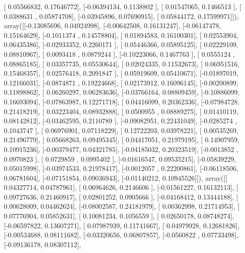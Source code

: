 \documentclass{article}
\begin{document}
       [ 0.05566832,  0.17646772],
       [-0.06394134,  0.1138802 ],
       [ 0.01547065,  0.1466513 ],
       [ 0.0388631 ,  0.05874708],
       [-0.03945896,  0.07690915],
       [ 0.05844172,  0.17599971]]), array([[-0.13085696,  0.04924998],
       [-0.00642508,  0.16131247],
       [-0.06147478,  0.15164629],
       [-0.1011374 ,  0.14578804],
       [ 0.01894583,  0.16100301],
       [ 0.02553904,  0.06435386],
       [-0.02933352,  0.2260171 ],
       [ 0.05446366,  0.05895125],
       [ 0.02229109,  0.08810967],
       [ 0.0093418 ,  0.0879244 ],
       [-0.10223066,  0.1467763 ],
       [ 0.0555124 ,  0.08865185],
       [ 0.03357735,  0.05530644],
       [ 0.02024335,  0.11532673],
       [ 0.06951516,  0.15468357],
       [ 0.02576418,  0.2091847 ],
       [ 0.05919609,  0.05410671],
       [-0.01897019,  0.12166031],
       [-0.0874871 ,  0.19224668],
       [ 0.02173912,  0.16096145],
       [-0.00200899,  0.11898862],
       [ 0.06260297,  0.06283636],
       [-0.03766164,  0.08809459],
       [-0.10886099,  0.16693094],
       [-0.07863987,  0.12271718],
       [ 0.04416099,  0.20362336],
       [-0.07984728,  0.21418219],
       [ 0.03223404,  0.08932888],
       [ 0.0500955 ,  0.08889275],
       [ 0.01410119,  0.08142812],
       [-0.03462595,  0.2110789 ],
       [-0.09082951,  0.22431049],
       [-0.0285274 ,  0.1043747 ],
       [ 0.06976901,  0.07118229],
       [ 0.12722203,  0.03978221],
       [ 0.00535269,  0.21496779],
       [ 0.05668263,  0.09495345],
       [ 0.04417051,  0.21979195],
       [ 0.14907959,  0.10915236],
       [-0.00379477,  0.04321785],
       [-0.04185032,  0.20323519],
       [-0.0013852 ,  0.0970823 ],
       [ 0.0729859 ,  0.0995402 ],
       [-0.01616547,  0.09535215],
       [-0.05839229,  0.05015998],
       [-0.03974533,  0.21978417],
       [-0.0012057 ,  0.22200861],
       [-0.06118506,  0.06781604],
       [-0.07151854,  0.09036943],
       [-0.01140212,  0.10945526]]), array([[ 0.04327714,  0.04787961],
       [ 0.06964626,  0.2146606 ],
       [-0.01561227,  0.16132113],
       [ 0.09727636,  0.21460917],
       [ 0.02801252,  0.0905666 ],
       [-0.04168412,  0.13444188],
       [ 0.00628009,  0.04462624],
       [-0.08002587,  0.24181979],
       [ 0.00362998,  0.21714953],
       [ 0.07776904,  0.05852631],
       [ 0.10081234,  0.1056559 ],
       [ 0.02650178,  0.08748274],
       [-0.06597822,  0.13607271],
       [ 0.07987939,  0.11741667],
       [ 0.04979928,  0.12681826],
       [-0.00534688,  0.08111682],
       [-0.03320656,  0.06807857],
       [-0.0560822 ,  0.07733498],
       [-0.09136178,  0.08307112],
\end{document}
